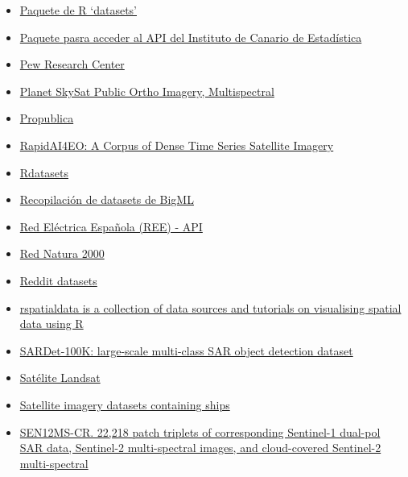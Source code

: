 \documentclass[
]{article}
\begin{document}
\begin{itemize}
\item
  \href{http://stat.ethz.ch/R-manual/R-patched/library/datasets/html/00Index.html}{Paquete
  de R `datasets'}
\item
  \href{https://github.com/rOpenSpain/istacbaser}{Paquete pasra acceder
  al API del Instituto de Canario de Estadística}
\item
  \href{https://www.pewresearch.org/download-datasets/}{Pew Research
  Center}
\item
  \href{https://developers.google.com/earth-engine/datasets/catalog/SKYSAT_GEN-A_PUBLIC_ORTHO_MULTISPECTRAL}{Planet
  SkySat Public Ortho Imagery, Multispectral}
\item
  \href{https://www.propublica.org/data/}{Propublica}
\item
  \href{https://beta.source.coop/repositories/planet/rapidai4eo/description/}{RapidAI4EO:
  A Corpus of Dense Time Series Satellite Imagery}
\item
  \href{https://vincentarelbundock.github.io/Rdatasets/articles/data.html}{Rdatasets}
\item
  \href{https://blog.bigml.com/list-of-public-data-sources-fit-for-machine-learning/}{Recopilación
  de datasets de BigML}
\item
  \href{https://www.ree.es/es/apidatos}{Red Eléctrica Española (REE) -
  API}
\item
  \href{https://www.miteco.gob.es/es/biodiversidad/servicios/banco-datos-naturaleza/informacion-disponible/rednatura2000_descargas.html}{Red
  Natura 2000}
\item
  \href{https://www.reddit.com/r/datasets/}{Reddit datasets}
\item
  \href{https://rspatialdata.github.io/}{rspatialdata is a collection of
  data sources and tutorials on visualising spatial data using R}
\item
  \href{https://eod-grss-ieee.com/dataset-detail/U1dJZE1BY1RwclAvOFFJQmlKR1Btdz09}{SARDet-100K:
  large-scale multi-class SAR object detection dataset}
\item
  \href{https://aws.amazon.com/public-data-sets/landsat/}{Satélite
  Landsat}
\item
  \href{https://github.com/jasonmanesis/Satellite-Imagery-Datasets-Containing-Ships}{Satellite
  imagery datasets containing ships}
\item
  \href{https://mediatum.ub.tum.de/1554803}{SEN12MS-CR. 22,218 patch
  triplets of corresponding Sentinel-1 dual-pol SAR data, Sentinel-2
  multi-spectral images, and cloud-covered Sentinel-2 multi-spectral
}
\end{itemize}
\end{document}
